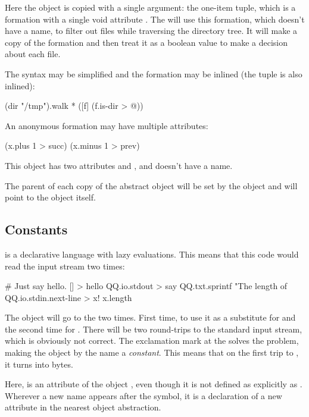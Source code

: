 Here the object  is copied with a single argument:
the one-item tuple, which is a formation with a single void attribute . The 
will use this formation, which doesn't have a name,
to filter out files while traversing the directory tree. It will
make a copy of the formation and then treat it as a boolean
value to make a decision about each file.

The syntax may be simplified and the formation may be inlined
(the tuple is also inlined):

\begin{ffcode}
(dir "/tmp").walk
  * ([f] (f.is-dir > @))
\end{ffcode}

An anonymous formation may have multiple attributes:

\begin{ffcode}
[x] (x.plus 1 > succ) (x.minus 1 > prev)
\end{ffcode}

This object has two attributes  and , and doesn't
have a name.

The parent of each copy of the abstract object will be set by
the object  and will point to the  object itself.

\subsection{Constants}

\eolang{} is a declarative language with lazy evaluations. This means
that this code would read the input stream two times:

\begin{ffcode}
# Just say hello.
[] > hello
  QQ.io.stdout > say
    QQ.txt.sprintf
      "The length of %
      QQ.io.stdin.next-line > x!
      x.length
\end{ffcode}

The  object will go to the  two times. First time,
to use it as a substitute for  and the second time for
. There will be two round-trips to the standard input stream, which
is obviously not correct. The exclamation mark at the  solves the
problem, making the object by the name  a \emph{constant}. This means
that on the first trip to , it turns into bytes.

Here,  is an attribute of the object , even though
it is not defined as explicitly as . Wherever a new
name appears after the \ff{>} symbol, it is a declaration of a new
attribute in the nearest object abstraction.

